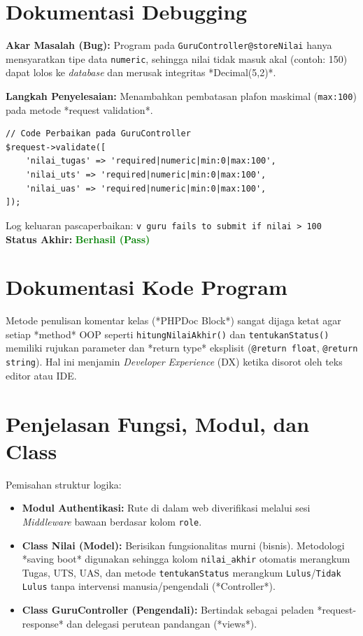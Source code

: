 \documentclass[12pt, a4paper]{article}
\newcommand{\statuspass}{\textcolor{green}{\textbf{Berhasil (Pass)}}}
\begin{document}
\section{Dokumentasi Debugging}
\textbf{Akar Masalah (Bug):}
Program pada \texttt{GuruController@storeNilai} hanya mensyaratkan tipe data \texttt{numeric}, sehingga nilai tidak masuk akal (contoh: 150) dapat lolos ke \textit{database} dan merusak integritas *Decimal(5,2)*.

\textbf{Langkah Penyelesaian:}
Menambahkan pembatasan plafon maskimal (\texttt{max:100}) pada metode *request validation*.
\begin{verbatim}
// Code Perbaikan pada GuruController
$request->validate([
    'nilai_tugas' => 'required|numeric|min:0|max:100',
    'nilai_uts' => 'required|numeric|min:0|max:100',
    'nilai_uas' => 'required|numeric|min:0|max:100',
]);
\end{verbatim}
Log keluaran pascaperbaikan: \texttt{v guru fails to submit if nilai > 100}\\
\textbf{Status Akhir:} \statuspass

\section{Dokumentasi Kode Program}
Metode penulisan komentar kelas (*PHPDoc Block*) sangat dijaga ketat agar setiap *method* OOP seperti \texttt{hitungNilaiAkhir()} dan \texttt{tentukanStatus()} memiliki rujukan parameter dan *return type* eksplisit (\texttt{@return float}, \texttt{@return string}). Hal ini menjamin \textit{Developer Experience} (DX) ketika disorot oleh teks editor atau IDE.

\section{Penjelasan Fungsi, Modul, dan Class}
Pemisahan struktur logika:
\begin{itemize}
    \item \textbf{Modul Authentikasi:} Rute di dalam web diverifikasi melalui sesi \textit{Middleware} bawaan berdasar kolom \texttt{role}.
    \item \textbf{Class Nilai (Model):} Berisikan fungsionalitas murni (bisnis). Metodologi *saving boot* digunakan sehingga kolom \texttt{nilai\_akhir} otomatis merangkum Tugas, UTS, UAS, dan metode \texttt{tentukanStatus} merangkum \texttt{Lulus}/\texttt{Tidak Lulus} tanpa intervensi manusia/pengendali (*Controller*).
    \item \textbf{Class GuruController (Pengendali):} Bertindak sebagai peladen *request-response* dan delegasi perutean pandangan (*views*).
\end{itemize}
\end{document}
